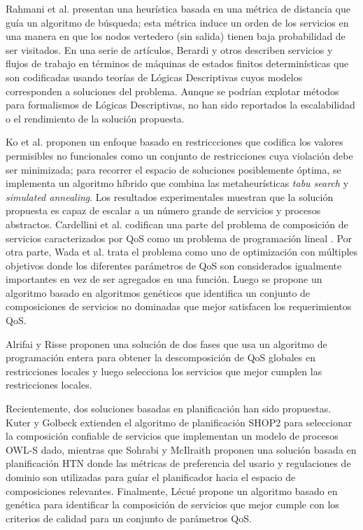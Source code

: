 Rahmani et al. \cite{rahmani08} presentan una heurística basada en una métrica de distancia
que guía un algoritmo de búsqueda; esta métrica induce un orden de
los servicios en una manera en que los nodos vertedero (sin salida) tienen baja probabilidad
de ser visitados. En una serie de artículos, Berardi y otros \cite{berardi05,berardi08,berardi06}
describen
servicios y flujos de trabajo en términos de máquinas de estados finitos
determinísticas que son codificadas usando teorías de Lógicas Descriptivas
cuyos modelos corresponden a soluciones del problema. Aunque se podrían explotar
métodos para formalismos de Lógicas Descriptivas, no han sido reportados la
escalabilidad o el rendimiento de la solución propuesta.

Ko et al. \cite{myoung08} proponen un enfoque basado en restriccciones que codifica
los valores permisibles no funcionales como un conjunto de restricciones cuya
violación debe ser minimizada; para recorrer el espacio de soluciones
posiblemente óptima, se implementa un algoritmo híbrido que combina las
metaheurísticas \emph{tabu search} y \emph{simulated annealing}. Los resultados
experimentales muestran que la solución propuesta es capaz de escalar a un
número grande de servicios y procesos abstractos. Cardellini et al. \cite{cardellini07}
codifican una parte del problema de composición de servicios caracterizados por QoS
como un problema de programación lineal \cite{cardellini07}. Por otra parte, Wada et al.
\cite{Hiroshi2008} trata el problema como uno de optimización con múltiples objetivos donde
los diferentes parámetros de QoS son considerados igualmente importantes en vez
de ser agregados en una función. Luego se propone un algoritmo basado en
algoritmos genéticos que identifica un conjunto de composiciones de servicios
no dominadas que mejor satisfacen los requerimientos QoS.

Alrifai y Risse \cite{alrifaiR09} proponen una solución de dos fases que usa un
algoritmo de programación entera para obtener la descomposición de QoS
globales en restricciones locales y luego selecciona los servicios que mejor
cumplen las restricciones locales.

Recientemente, dos soluciones basadas en planificación han sido propuestas.
Kuter y Golbeck \cite{kuterG09} extienden el algoritmo de planificación SHOP2 para
seleccionar la composición confiable de servicios que implementan un modelo de
procesos OWL-S dado, mientras que Sohrabi y McIlraith \cite{sohrabiM09} proponen una
solución basada en planificación HTN donde las métricas de preferencia del
usario y regulaciones de dominio son utilizadas para guíar el planificador hacia
el espacio de composiciones relevantes. Finalmente, Lécué \cite{lecue09} propone un
algoritmo basado en genética para identificar la composición de servicios que
mejor cumple con los criterios de calidad para un conjunto de parámetros QoS.

